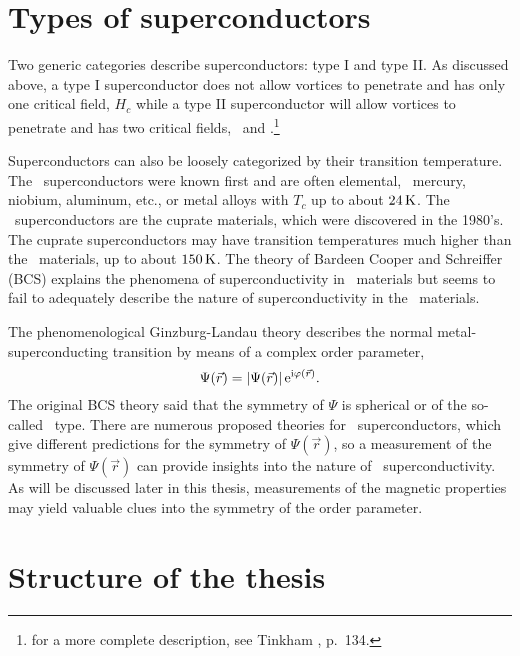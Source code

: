 \section{Types of superconductors}

%
%
Two generic categories describe superconductors: type I and type II. 
As discussed above, a type I superconductor does not allow vortices to 
penetrate and has only one critical field, $H_c$ while a 
type II superconductor
will allow vortices to penetrate and has two 
critical fields, \hcone\ and \hctwo.\footnote{for a more complete 
description, see Tinkham \cite{tinkham}, p.~134.}


Superconductors can also be loosely categorized by their transition 
temperature. The \lowtc\ superconductors were known first and 
are often elemental, 
 \ie\ mercury, niobium, aluminum, etc., or metal alloys with $T_c$ up to 
about $24\,\kelvin$. 
The \hightc\ superconductors are the cuprate materials, which were
discovered in the 1980's. 
The cuprate superconductors may have transition temperatures
much higher than the \lowtc\ materials, up to about $150\,\kelvin$. 
The theory of Bardeen Cooper and Schreiffer 
(BCS) \cite{bardeen_pr_108_1957} 
explains the phenomena of superconductivity in \lowtc\
materials but seems to fail 
to adequately
describe the nature of superconductivity 
in the \hightc\ materials. 

The phe\-nom\-eno\-log\-i\-cal Ginzburg-Landau theory
\cite{ginzburg_zeitf_20_1064_1950} describes the normal 
metal-superconducting 
transition by means of a complex order parameter,
%
\begin{equation}
\label{eqn:orderparameter}
\Psi(\vec r) = \left| \Psi(\vec r) \right| \me^{\mi\varphi(\vec r)}.
\end{equation}
%
The original BCS theory said that the symmetry of $\Psi$ is spherical 
or of the so-called \swave\ type. 
There are numerous proposed theories for \hightc\ superconductors, which
give different predictions for the symmetry of $\Psi(\vec r)$, so a measurement
of the symmetry of $\Psi(\vec r)$ can provide insights into the nature
of \hightc\ superconductivity. As will be discussed later in this
thesis, measurements of the magnetic properties may yield valuable 
clues into the symmetry of the order parameter. 


\section{Structure of the thesis}


